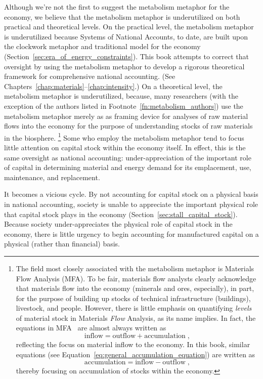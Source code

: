 Although we're not the first to suggest the metabolism metaphor for the economy,
we believe that
the metabolism metaphor is underutilized 
on both practical and theoretical levels.
On the practical level, the metabolism metaphor is underutilized
because Systems of National Accounts, to date, 
are built upon the clockwork metaphor and traditional model for the economy
(Section~\ref{sec:era_of_energy_constraints}).
This book attempts to correct that oversight 
by using the metabolism metaphor 
to develop a rigorous theoretical framework 
for comprehensive national accounting.
(See Chapters~\ref{chap:materials}--\ref{chap:intensity}.)
On a theoretical level, the metabolism metaphor is underutilized, 
because, many researchers (with the exception of
the authors listed in Footnote~\ref{fn:metabolism_authors})
use the metabolism metaphor merely as as framing device for analyses of
raw material flows into the economy for the purpose of understanding 
stocks of raw materials in the biosphere.%
	\footnote{The field most closely associated with the metabolism metaphor is
	Materials Flow Analysis (MFA). 
	To be fair, materials flow analysts clearly acknowledge that 
	materials flow into the economy (minerals and ores, especially),
	in part,
	for the purpose of building up stocks of technical infrastructure (buildings),
	livestock, and people.\cite[p.~116]{F-K1999} 
	However, there is little emphasis on quantifying \emph{levels} 
	of material stock in Materials \emph{Flow} Analysis, 
	as its name implies.
	In fact, the equations in MFA~\cite[Equation~1]{F-K1999} are almost always written as
	\begin{equation*}
		\mathrm{inflow} = \mathrm{outflow} + \mathrm{accumulation \; ,}
	\end{equation*}
	reflecting the focus on material inflow to the economy.
	In this book, similar equations 
	(see Equation~\ref{eq:general_accumulation_equation}) 
	are written as
	\begin{equation*}
		\mathrm{accumulation} = \mathrm{inflow} - \mathrm{outflow \; ,}
	\end{equation*}
	thereby focusing on accumulation of stocks within the economy.
	}
Some who employ the metabolism metaphor
tend to focus little attention on capital stock within the economy itself.
In effect, this is the same oversight as national accounting: 
under-appreciation of the important role of capital
in determining material and energy demand 
for its emplacement, use, maintenance, and replacement.

It becomes a vicious cycle. 
By not accounting for capital stock on a physical basis 
in national accounting, 
society is unable to appreciate 
the important physical role that capital stock plays in the economy
(Section~\ref{sec:stall_capital_stock}).
Because society under-appreciates the physical role of capital stock in the economy, 
there is little urgency to begin accounting 
for manufactured capital on a physical (rather than financial) basis.

